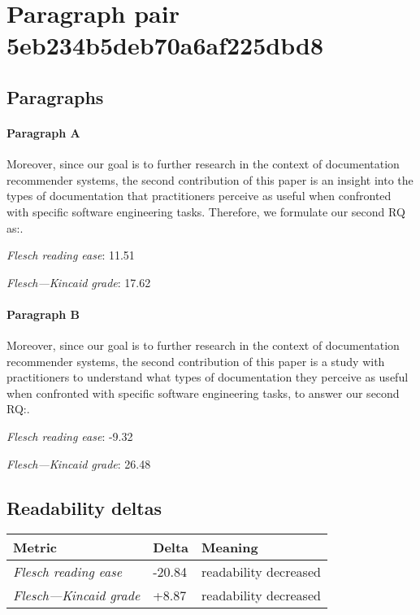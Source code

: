 \section{Paragraph pair 5eb234b5deb70a6af225dbd8}
\subsection{Paragraphs}
\paragraph{Paragraph A}
Moreover, since our goal is to further research in the context of documentation recommender systems, the second contribution of this paper is an insight into the types of documentation that practitioners perceive as useful when confronted with specific software engineering tasks. Therefore, we formulate our second RQ as:.\par\medskip
\emph{Flesch reading ease}: 11.51\par
\emph{Flesch---Kincaid grade}: 17.62

\paragraph{Paragraph B}
Moreover, since our goal is to further research in the context of documentation recommender systems, the second contribution of this paper is a study with practitioners to understand what types of documentation they perceive as useful when confronted with specific software engineering tasks, to answer our second RQ:.\par\medskip
\emph{Flesch reading ease}: -9.32\par
\emph{Flesch---Kincaid grade}: 26.48

\subsection{Readability deltas}

\begin{tabular}{lll}
\toprule
               \textbf{Metric} & \textbf{Delta} &       \textbf{Meaning} \\
\midrule
    \emph{Flesch reading ease} &         -20.84 &  readability decreased \\
 \emph{Flesch---Kincaid grade} &          +8.87 &  readability decreased \\
\bottomrule
\end{tabular}

